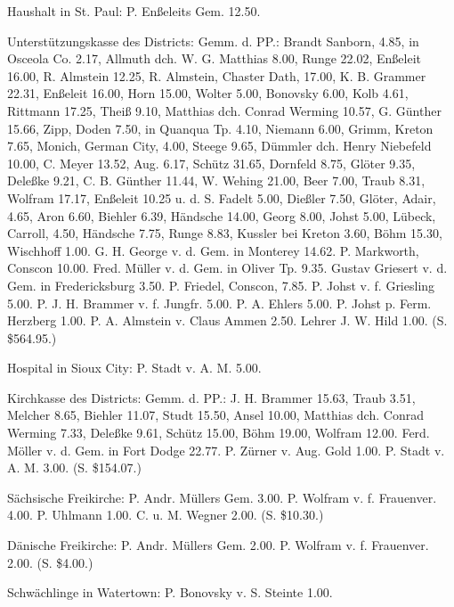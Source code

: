 Haushalt in St. Paul: P. Enßeleits Gem. 12.50.

Unterstützungskasse des Districts: Gemm. d. PP.: Brandt Sanborn, 4.85, in Osceola Co. 2.17, Allmuth dch. W. G. Matthias 8.00, Runge 22.02, Enßeleit 16.00, R. Almstein 12.25, R. Almstein, Chaster Dath, 17.00, K. B. Grammer 22.31, Enßeleit 16.00, Horn 15.00, Wolter 5.00, Bonovsky 6.00, Kolb 4.61, Rittmann 17.25, Theiß 9.10, Matthias dch. Conrad Werming 10.57, G. Günther 15.66, Zipp, Doden 7.50, in Quanqua Tp. 4.10, Niemann 6.00, Grimm, Kreton 7.65, Monich, German City, 4.00, Steege 9.65, Dümmler dch. Henry Niebefeld 10.00, C. Meyer 13.52, Aug. 6.17, Schütz 31.65, Dornfeld 8.75, Glöter 9.35, Deleßke 9.21, C. B. Günther 11.44, W. Wehing 21.00, Beer 7.00, Traub 8.31, Wolfram 17.17, Enßeleit 10.25 u. d. S. Fadelt 5.00, Dießler 7.50, Glöter, Adair, 4.65, Aron 6.60, Biehler 6.39, Händsche 14.00, Georg 8.00, Johst 5.00, Lübeck, Carroll, 4.50, Händsche 7.75, Runge 8.83, Kussler bei Kreton 3.60, Böhm 15.30, Wischhoff 1.00. G. H. George v. d. Gem. in Monterey 14.62. P. Markworth, Conscon 10.00. Fred. Müller v. d. Gem. in Oliver Tp. 9.35. Gustav Griesert v. d. Gem. in Fredericksburg 3.50. P. Friedel, Conscon, 7.85. P. Johst v. f. Griesling 5.00. P. J. H. Brammer v. f. Jungfr. 5.00. P. A. Ehlers 5.00. P. Johst p. Ferm. Herzberg 1.00. P. A. Almstein v. Claus Ammen 2.50. Lehrer J. W. Hild 1.00. (S. \$564.95.)

Hospital in Sioux City: P. Stadt v. A. M. 5.00.

Kirchkasse des Districts: Gemm. d. PP.: J. H. Brammer 15.63, Traub 3.51, Melcher 8.65, Biehler 11.07, Studt 15.50, Ansel 10.00, Matthias dch. Conrad Werming 7.33, Deleßke 9.61, Schütz 15.00, Böhm 19.00, Wolfram 12.00. Ferd. Möller v. d. Gem. in Fort Dodge 22.77. P. Zürner v. Aug. Gold 1.00. P. Stadt v. A. M. 3.00. (S. \$154.07.)

Sächsische Freikirche: P. Andr. Müllers Gem. 3.00. P. Wolfram v. f. Frauenver. 4.00. P. Uhlmann 1.00. C. u. M. Wegner 2.00. (S. \$10.30.)

Dänische Freikirche: P. Andr. Müllers Gem. 2.00. P. Wolfram v. f. Frauenver. 2.00. (S. \$4.00.)

Schwächlinge in Watertown: P. Bonovsky v. S. Steinte 1.00.

